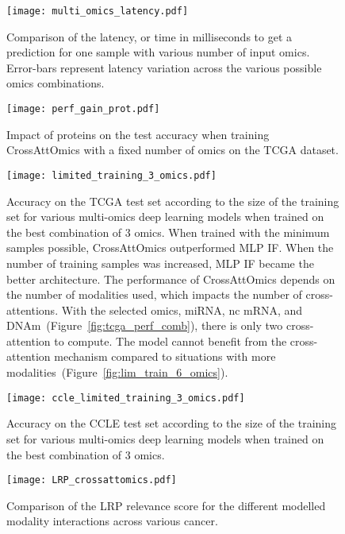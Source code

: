 	\begin{figure}
	    \centering
	    \texttt{[image: multi\_omics\_latency.pdf]}
	    \caption{Comparison of the latency, or time in milliseconds to get a prediction for one sample with various number of input omics. Error-bars represent latency variation across the various possible omics combinations.}\label{fig:latency}
	\end{figure}

	\begin{figure}[htbp]
	    \centering
	    \texttt{[image: perf\_gain\_prot.pdf]}
	    \caption{Impact of proteins on the test accuracy when training CrossAttOmics with a fixed number of omics on the TCGA dataset.}\label{fig:perf_gain_prot}
	\end{figure}

	\begin{figure}[htbp]
	    \centering
	    \texttt{[image: limited\_training\_3\_omics.pdf]}
	    \caption{Accuracy on the TCGA test set according to the size of the training set for various multi-omics deep learning models when trained on the best combination of 3 omics. When trained with the minimum samples possible, CrossAttOmics outperformed MLP IF\@. When the number of training samples was increased, MLP IF became the better architecture. The performance of CrossAttOmics depends on the number of modalities used, which impacts the number of cross-attentions. With the selected omics, miRNA, nc mRNA, and DNAm~(Figure~\ref{fig:tcga_perf_comb}), there is only two cross-attention to compute. The model cannot benefit from the cross-attention mechanism compared to situations with more modalities~(Figure~\ref{fig:lim_train_6_omics}).}\label{fig:lim_train_3_omics}
	\end{figure}



	\begin{figure}[htbp]
	    \centering
	    \texttt{[image: ccle\_limited\_training\_3\_omics.pdf]}
	    \caption{Accuracy on the CCLE test set according to the size of the training set for various multi-omics deep learning models when trained on the best combination of 3 omics.}\label{fig:ccle_limited_train}
	\end{figure}

	\begin{figure}[htbp]
	    \centering
	    \texttt{[image: LRP\_crossattomics.pdf]}
	    \caption{Comparison of the LRP relevance score for the different modelled modality interactions across various cancer.}\label{fig:LRP_CrossAttOmics}
	\end{figure}

